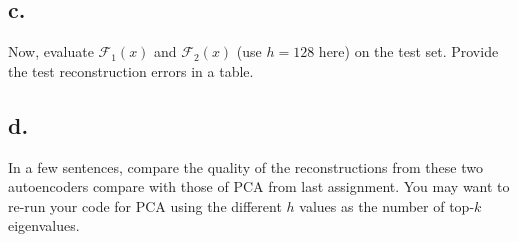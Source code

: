 \documentclass{article}
\newcommand{\1}{\mathbf{1}}
\begin{document}
{\subsection*{c.}

Now, evaluate $\mathcal{F}_1(x)$ and $\mathcal{F}_2(x)$ (use $h = 128$     here) on the test set. Provide the test reconstruction errors in a table.

\subsection*{d.}

In a few sentences, compare the quality of the reconstructions from these two autoencoders compare with those of PCA from last assignment. You may want to re-run your code for PCA using the different $h$ values as the number of top-$k$ eigenvalues.

}
\end{document}
